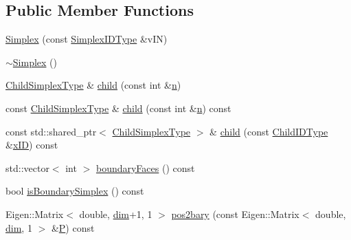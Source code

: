\subsection*{Public Member Functions}
\begin{DoxyCompactItemize}
\item 
\hyperlink{classmodel_1_1_simplex_3_01dim_00_01dim_01_4_acad9db3ba37ea0e86f9b078be256f306}{Simplex} (const \hyperlink{classmodel_1_1_simplex_3_01dim_00_01dim_01_4_a8d7186530898fce37d1bce8480342a36}{Simplex\+I\+D\+Type} \&v\+I\+N)
\item 
\hyperlink{classmodel_1_1_simplex_3_01dim_00_01dim_01_4_a4088c67e3755b1a5872ac00b7d4dac64}{$\sim$\+Simplex} ()
\item 
\hyperlink{classmodel_1_1_simplex_3_01dim_00_01dim_01_4_a98484d69325ced6e24564af07c180261}{Child\+Simplex\+Type} \& \hyperlink{classmodel_1_1_simplex_3_01dim_00_01dim_01_4_a708a63e87abd3fb2989125f6dc8fdf15}{child} (const int \&\hyperlink{_f_e_m_2linear__elasticity__3d_2tetgen_2generate_p_o_l_ycube_8m_a74637fc31d6aedd6d61cdc0c8154bc13}{n})
\item 
const \hyperlink{classmodel_1_1_simplex_3_01dim_00_01dim_01_4_a98484d69325ced6e24564af07c180261}{Child\+Simplex\+Type} \& \hyperlink{classmodel_1_1_simplex_3_01dim_00_01dim_01_4_ab546e1cff7bbe9069b59f2fb17e039ce}{child} (const int \&\hyperlink{_f_e_m_2linear__elasticity__3d_2tetgen_2generate_p_o_l_ycube_8m_a74637fc31d6aedd6d61cdc0c8154bc13}{n}) const 
\item 
const std\+::shared\+\_\+ptr$<$ \hyperlink{classmodel_1_1_simplex_3_01dim_00_01dim_01_4_a98484d69325ced6e24564af07c180261}{Child\+Simplex\+Type} $>$ \& \hyperlink{classmodel_1_1_simplex_3_01dim_00_01dim_01_4_a59aec9cc63692e8bfde3efc15ae0d35c}{child} (const \hyperlink{classmodel_1_1_simplex_3_01dim_00_01dim_01_4_ab1ada569e89e2332e245a1ab0cb8a4f9}{Child\+I\+D\+Type} \&\hyperlink{structmodel_1_1_simplex_base_a477508d711a1cb001ccd895f88665a59}{x\+I\+D}) const 
\item 
std\+::vector$<$ int $>$ \hyperlink{classmodel_1_1_simplex_3_01dim_00_01dim_01_4_afaa4b347ef0fd80ed78c2b1370e98cc8}{boundary\+Faces} () const 
\item 
bool \hyperlink{classmodel_1_1_simplex_3_01dim_00_01dim_01_4_af3f8e6638f5b528ca084ea0864817544}{is\+Boundary\+Simplex} () const 
\item 
Eigen\+::\+Matrix$<$ double, \hyperlink{plot_nd_a_8m_a382f3ca768b275b8d563604f7fc7df73}{dim}+1, 1 $>$ \hyperlink{classmodel_1_1_simplex_3_01dim_00_01dim_01_4_a676370ab2d53d8604336840457c789ab}{pos2bary} (const Eigen\+::\+Matrix$<$ double, \hyperlink{plot_nd_a_8m_a382f3ca768b275b8d563604f7fc7df73}{dim}, 1 $>$ \&\hyperlink{_f_e_m_2linear__elasticity__3d_2tetgen_2generate_p_o_l_ycube_8m_a50a9afb44201a65ab7ad5feb2150aeb6}{P}) const 

\end{DoxyCompactItemize}
